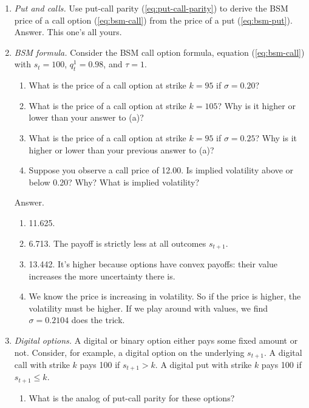 \documentclass[11pt]{article}
\begin{document}
\begin{enumerate}
\item {\it Put and calls.\/}
Use put-call parity (\ref{eq:put-call-parity})
to derive the BSM price of a call option (\ref{eq:bsm-call})
from the price of a put (\ref{eq:bsm-put}).
%
Answer.  This one's all yours.

\item {\it BSM formula.\/}
Consider the BSM call option formula, equation (\ref{eq:bsm-call})
with $s_t = 100$, $q^1_t = 0.98$, and $\tau = 1$.
%
\begin{enumerate}
\item What is the price of a call option at strike $k = 95$ if $\sigma = 0.20$?
\item What is the price of a call option at strike $k=105$?
Why is it higher or lower than your answer to (a)?
\item What is the price of a call option at strike $k = 95$ if $\sigma = 0.25$?
Why is it higher or lower than your previous answer to (a)?
\item Suppose you observe a call price of 12.00.
Is implied volatility above or below 0.20?
Why?
What is implied volatility?
\end{enumerate}
%
Answer.
\begin{enumerate}
\item 11.625.
\item 6.713. The payoff is strictly less at all outcomes $s_{t+1}$.
\item 13.442.
It's higher because options have convex payoffs:
their value increases the more uncertainty there is.
\item We know the price is increasing in volatility.
So if the price is higher, the volatility must be higher.
If we play around with values, we find $\sigma = 0.2104$ does the trick.
\end{enumerate}

\item {\it Digital options.\/}
A digital or binary option either pays some fixed amount or not.
Consider, for example, a digital option on the underlying $s_{t+1}$.
A digital call with strike $k$ pays 100 if $s_{t+1} > k$.
A digital put with strike $k$ pays 100 if $s_{t+1} \leq k$.
%
\begin{enumerate}
\item What is the analog of put-call parity for these options?


\end{enumerate}
\end{enumerate}
\end{document}
